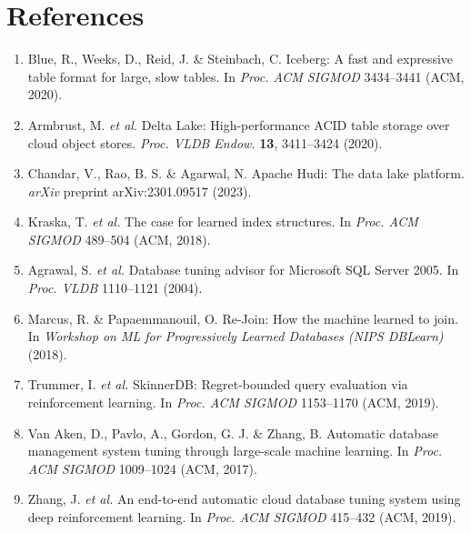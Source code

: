 \documentclass[fleqn,10pt]{wlscirep}
\begin{document}
\FloatBarrier

\section*{References}

\begin{enumerate}

\item Blue, R., Weeks, D., Reid, J. \& Steinbach, C. Iceberg: A fast and
  expressive table format for large, slow tables. In \textit{Proc. ACM
  SIGMOD} 3434--3441 (ACM, 2020).

\item Armbrust, M. \textit{et al.} Delta Lake: High-performance ACID table
  storage over cloud object stores. \textit{Proc. VLDB Endow.}
  \textbf{13}, 3411--3424 (2020).

\item Chandar, V., Rao, B. S. \& Agarwal, N. Apache Hudi: The data lake
  platform. \textit{arXiv} preprint arXiv:2301.09517 (2023).

\item Kraska, T. \textit{et al.} The case for learned index structures. In
  \textit{Proc. ACM SIGMOD} 489--504 (ACM, 2018).

\item Agrawal, S. \textit{et al.} Database tuning advisor for Microsoft SQL
  Server 2005. In \textit{Proc. VLDB} 1110--1121 (2004).

\item Marcus, R. \& Papaemmanouil, O. Re-Join: How the machine learned to
  join. In \textit{Workshop on ML for Progressively Learned Databases
  (NIPS DBLearn)} (2018).

\item Trummer, I. \textit{et al.} SkinnerDB: Regret-bounded query evaluation
  via reinforcement learning. In \textit{Proc. ACM SIGMOD} 1153--1170
  (ACM, 2019).

\item Van Aken, D., Pavlo, A., Gordon, G. J. \& Zhang, B. Automatic
  database management system tuning through large-scale machine learning.
  In \textit{Proc. ACM SIGMOD} 1009--1024 (ACM, 2017).

\item Zhang, J. \textit{et al.} An end-to-end automatic cloud database
  tuning system using deep reinforcement learning. In \textit{Proc. ACM
  SIGMOD} 415--432 (ACM, 2019).


\end{enumerate}
\end{document}
